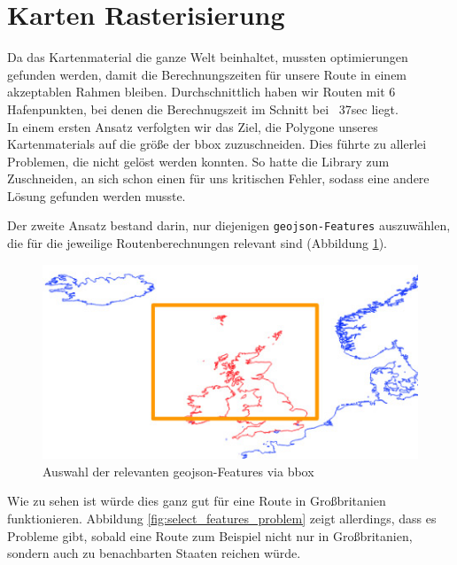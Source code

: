 \documentclass[letterpaper]{article}
\begin{document}
\section{Karten Rasterisierung}
	Da das Kartenmaterial die ganze Welt beinhaltet, mussten optimierungen gefunden werden, damit die Berechnungszeiten für unsere Route in einem akzeptablen Rahmen bleiben. Durchschnittlich haben wir Routen mit 6 Hafenpunkten, bei denen die  Berechnugszeit im Schnitt bei ~37sec liegt.\\

	In einem ersten Ansatz verfolgten wir das Ziel, die Polygone unseres Kartenmaterials auf die größe der bbox zuzuschneiden. Dies führte zu allerlei Problemen, die nicht gelöst werden konnten. So hatte die Library zum Zuschneiden, an sich schon einen für uns kritischen Fehler\footnotemark, sodass eine andere Lösung gefunden werden musste.

	Der zweite Ansatz bestand darin, nur diejenigen \texttt{geojson-Features} auszuwählen, die für die jeweilige Routenberechnungen relevant sind (Abbildung \ref{fig:select_features}).

	\begin{figure}[!htbp]
		\centering
		\includegraphics[width=\linewidth]{select_features}
		\caption{Auswahl der relevanten geojson-Features via bbox}
		\label{fig:select_features}
	\end{figure}

	Wie zu sehen ist würde dies ganz gut für eine Route in Großbritanien funktionieren. Abbildung \ref{fig:select_features_problem} zeigt allerdings, dass es Probleme gibt, sobald eine Route zum Beispiel nicht nur in Großbritanien, sondern auch zu benachbarten Staaten reichen würde. 
\end{document}
